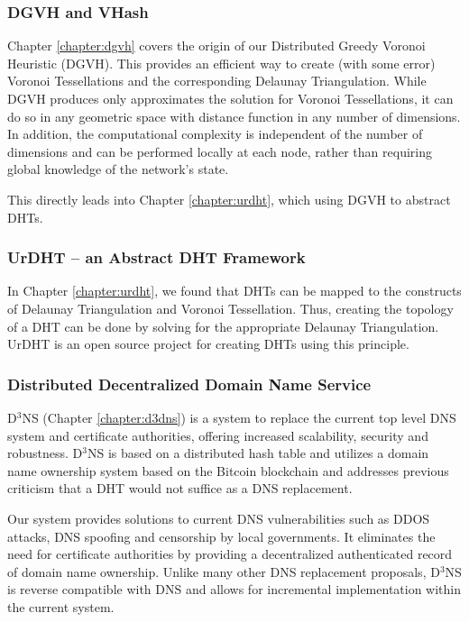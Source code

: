 \subsubsection{DGVH and VHash}

Chapter \ref{chapter:dgvh} covers the origin of our Distributed Greedy Voronoi Heuristic (DGVH).
This provides an efficient way to create (with some error) Voronoi Tessellations and the corresponding Delaunay Triangulation.
While DGVH produces only approximates the solution for Voronoi Tessellations, it can do so in any geometric space with distance function in any number of dimensions.
In addition, the computational complexity is independent of the number of dimensions and can be performed locally at each node, rather than requiring global knowledge of the network's state.

This directly leads into Chapter \ref{chapter:urdht}, which using DGVH to abstract DHTs.

\subsubsection{UrDHT -- an Abstract DHT Framework}
In Chapter \ref{chapter:urdht}, we found that DHTs can be mapped to the constructs of Delaunay Triangulation and Voronoi Tessellation.
Thus, creating the topology of a DHT can be done by solving for the appropriate Delaunay Triangulation.
UrDHT is an open source project for creating DHTs using this principle.



\subsubsection{Distributed Decentralized Domain Name Service}
D$^{3}$NS (Chapter \ref{chapter:d3dns}) is a system to replace the current top level DNS system and certificate authorities, offering increased scalability, security and robustness. 
D$^{3}$NS is based on a distributed hash table and utilizes a domain name ownership system based on the Bitcoin blockchain \cite{bitcoin} and addresses previous criticism that a DHT would not suffice as a DNS replacement. 

Our system provides solutions to current DNS vulnerabilities such as DDOS attacks, DNS spoofing and censorship by local governments.
It eliminates the need for certificate authorities by providing a decentralized authenticated record of domain name ownership. 
Unlike many other DNS replacement proposals, D$^{3}$NS is reverse compatible with DNS and allows for incremental implementation within the current system.

